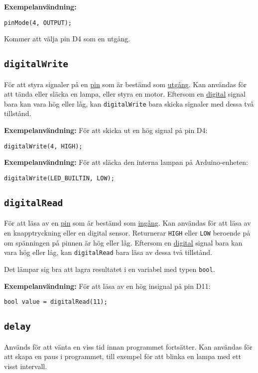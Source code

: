 \documentclass[11pt]{article}
\begin{document}
\textbf{Exempelanvändning:}
\begin{lstlisting}
pinMode(4, OUTPUT);
\end{lstlisting}
Kommer att välja pin D4 som en utgång.

\subsection{\texttt{digitalWrite}}
För att styra signaler på en \hyperref[sec:pin]{pin} som är bestämd som
\hyperref[sec:io]{utgång}. Kan användas för att tända eller släcka en lampa,
eller styra en motor. Eftersom en \hyperref[sec:analog-digital]{digital} signal
bara kan vara hög eller låg, kan \texttt{digitalWrite} bara skicka signaler med
dessa två tillstånd.

\textbf{Exempelanvändning:}
För att skicka ut en hög signal på pin D4:
\begin{lstlisting}
digitalWrite(4, HIGH);
\end{lstlisting}

\textbf{Exempelanvändning:}
För att släcka den interna lampan på Arduino-enheten:
\begin{lstlisting}
digitalWrite(LED_BUILTIN, LOW);
\end{lstlisting}

\subsection{\texttt{digitalRead}}
För att läsa av en \hyperref[sec:pin]{pin} som är bestämd som
\hyperref[sec:io]{ingång}. Kan användas för att läsa av en knapptryckning eller
en digital sensor. Returnerar \texttt{HIGH} eller \texttt{LOW} beroende på om
spänningen på pinnen är hög eller låg. Eftersom en
\hyperref[sec:analog-digital]{digital} signal bara kan vara hög eller låg, kan
\texttt{digitalRead} bara läsa av dessa två tillstånd.

Det lämpar sig bra att lagra resultatet i en variabel med typen \texttt{bool}.

\textbf{Exempelanvändning:}
För att läsa av en hög insignal på pin D11:
\begin{lstlisting}
bool value = digitalRead(11);
\end{lstlisting}

\subsection{\texttt{delay}}
Används för att vänta en viss tid innan programmet fortsätter. Kan användas för
att skapa en paus i programmet, till exempel för att blinka en lampa med ett
visst intervall.
\end{document}
